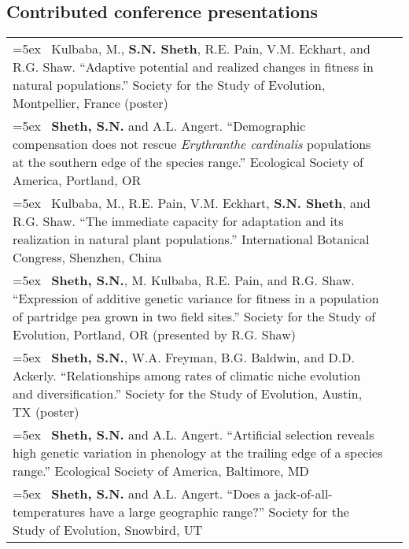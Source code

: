 \documentclass[11pt,english]{article}\usepackage[]{graphicx}\usepackage[]{color}
\providecommand{\tabularnewline}{\\}
\begin{document}
\begin{samepage}

\subsection*{Contributed conference presentations} \Needspace{2in} %

\renewcommand{\arraystretch}{1.2}
\begin{tabularx}{\textwidth}{@{}>{\raggedright}p{5.25in} >{\raggedleft}X@{}}

\hangindent=5ex \ Kulbaba, M., \textbf{S.N. Sheth}, R.E. Pain, V.M. Eckhart, and R.G. Shaw. ``Adaptive potential and realized changes in fitness in natural populations.'' Society for the Study of Evolution, Montpellier, France (poster) & 2018 \tabularnewline

\hangindent=5ex \ \textbf{Sheth, S.N.} and A.L. Angert. ``Demographic compensation does not rescue \textit{Erythranthe cardinalis} populations at the southern edge of the species range.'' Ecological Society of America, Portland, OR & 2017 \tabularnewline

\hangindent=5ex \ Kulbaba, M., R.E. Pain, V.M. Eckhart, \textbf{S.N. Sheth}, and R.G. Shaw. ``The immediate capacity for adaptation and its realization in natural plant populations.'' International Botanical Congress, Shenzhen, China & 2017 \tabularnewline

\hangindent=5ex \ \textbf{Sheth, S.N.}, M. Kulbaba, R.E. Pain, and R.G. Shaw. ``Expression of additive genetic variance for fitness in a population of partridge pea grown in two field sites.'' Society for the Study of Evolution, Portland, OR (presented by R.G. Shaw) & 2017 \tabularnewline

\hangindent=5ex \ \textbf{Sheth, S.N.}, W.A. Freyman, B.G. Baldwin, and D.D. Ackerly. ``Relationships among rates of climatic niche evolution and diversification.'' Society for the Study of Evolution, Austin, TX (poster) & 2016 \tabularnewline

\hangindent=5ex \ \textbf{Sheth, S.N.} and A.L. Angert. ``Artificial selection reveals high genetic variation in phenology at the trailing edge of a species range.'' Ecological Society of America, Baltimore, MD & 2015 \tabularnewline

\hangindent=5ex \ \textbf{Sheth, S.N.} and A.L. Angert. ``Does a jack-of-all-temperatures have a large geographic range?'' Society for the Study of Evolution, Snowbird, UT & 2013 \tabularnewline


\end{tabularx}
\end{samepage}
\end{document}
